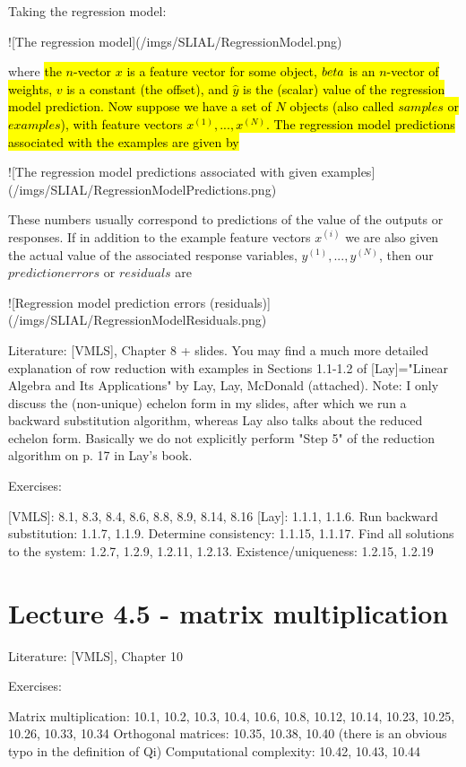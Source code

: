 \documentclass[11pt,oneside,a4paper,openright]{article}
\begin{document}
Taking the regression model:

![The regression model](/imgs/SLIAL/RegressionModel.png)

where \hl{the $n$-vector $x$ is a feature vector for some object, $\\beta$ is an $n$-vector of weights, $v$ is a constant (the offset), and $\hat{y}$ is the (scalar) value of the regression model prediction.
Now suppose we have a set of $N$ objects (also called $samples$ or $examples$), with feature vectors $x^(1), ... , x^(N)$. The regression model predictions associated with the examples are given by}

![The regression model predictions associated with given examples](/imgs/SLIAL/RegressionModelPredictions.png)

These numbers usually correspond to predictions of the value of the outputs or responses. If in addition to the example feature vectors $x^(i)$ we are also given the actual value of the associated response variables, $y^(1), ..., y^(N)$, then our $prediction errors$ or $residuals$ are

![Regression model prediction errors (residuals)](/imgs/SLIAL/RegressionModelResiduals.png)

Literature: [VMLS], Chapter 8 + slides. You may find a much more detailed explanation of row reduction with examples in Sections 1.1-1.2 of [Lay]="Linear Algebra and Its Applications" by Lay, Lay, McDonald (attached). Note: I only discuss the (non-unique) echelon form in my slides, after which we run a backward substitution algorithm, whereas Lay also talks about the reduced echelon form. Basically we do not explicitly perform "Step 5" of the reduction algorithm on p. 17 in Lay's book.

Exercises:

[VMLS]: 8.1, 8.3, 8.4, 8.6, 8.8, 8.9, 8.14, 8.16
[Lay]: 1.1.1, 1.1.6. Run backward substitution: 1.1.7, 1.1.9. Determine consistency: 1.1.15, 1.1.17. Find all solutions to the system: 1.2.7, 1.2.9, 1.2.11, 1.2.13. Existence/uniqueness: 1.2.15, 1.2.19

\section*{Lecture 4.5 - matrix multiplication}

Literature: [VMLS], Chapter 10

Exercises:

Matrix multiplication: 10.1, 10.2, 10.3, 10.4, 10.6, 10.8, 10.12, 10.14, 10.23, 10.25, 10.26, 10.33, 10.34
Orthogonal matrices: 10.35, 10.38, 10.40 (there is an obvious typo in the definition of Qi)
Computational complexity: 10.42, 10.43, 10.44
\end{document}
